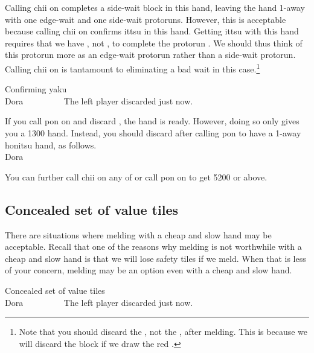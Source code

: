 \bigskip
Calling {\jap chii} on {\LARGE{}} completes a side-wait block in this hand, leaving the hand 1-away with one edge-wait and one side-wait protoruns. 
However, this is acceptable because calling {\jap chii} on {\LARGE{}} confirms {\jap ittsu} in this hand. Getting {\jap ittsu} with this hand requires that we have {\LARGE{}}, not {\LARGE{}}, to complete the protorun {\LARGE{}}. We should thus think of this protorun more as an edge-wait protorun rather than a side-wait protorun. Calling {\jap chii} on {\LARGE{}} is tantamount to eliminating a bad wait in this case.\footnote{Note that you should discard the , not the , after melding. This is because we will discard the {} block if we draw the red \rfw.}

\bigskip
\begin{itembox}[r]{Confirming {\jap yaku}}
\bp
{}\dong\dong\dong\nan\nan~~\fa\\
\hfill\footnotesize{{\jap Dora}~~~~~~~~~}
\ep {}
\vspace{-15pt}The left player discarded {\LARGE{}} just now.
\end{itembox}

\bigskip
If you call {\jap pon} on {\LARGE{}} and discard {\LARGE{}}, the hand is ready. However, doing so only gives you a 1300 hand. Instead, you should discard {\LARGE{}} after calling {\jap pon} to have a 1-away {\jap honitsu} hand, as follows.
\bp
{}\dong\dong\dong\nan\nan~~~\fa\\
\hfill\footnotesize{{\jap Dora}~~~~~~~~~~~}
\ep

You can further call {\jap chii} on any of {\LARGE{}} or call {\jap pon} on {\LARGE\nan} to get 5200 or above. 

\bigskip
\subsection{Concealed set of value tiles}
There are situations where melding with a cheap and slow hand may be acceptable. Recall that one of the reasons why melding is not worthwhile with a cheap and slow hand is that we will lose safety tiles if we meld. When that is less of your concern, melding may be an option even with a cheap and slow hand. 

\bigskip
\begin{itembox}[r]{Concealed set of value tiles}
\bp
{}\zhong\zhong\zhong~~\xi\\
\hfill\footnotesize{{\jap Dora}~~~~~~~~~}
\ep
\vspace{-15pt}The left player discarded {\LARGE{}} just now.
\end{itembox}

